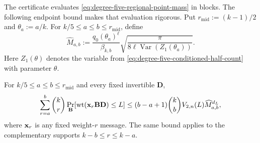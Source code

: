 The certificate evaluates \eqref{eq:degree-five-regional-point-mass} in
blocks.  The following endpoint bound makes that evaluation rigorous.  Put
$r_{\mathrm{mid}}:=(k-1)/2$ and $\theta_a:=a/k$.  For
$k/5\leq a\leq b\leq r_{\mathrm{mid}}$, define
\begin{equation}
 \widehat M_{a,b}:=
 \frac{q_0(\theta_a)^\ell}{\beta_{k,b}}
 \sqrt{\frac{\pi}{8\ell\operatorname{Var}(Z_1(\theta_a))}}.
 \label{eq:degree-five-block-point-mass}
\end{equation}
Here $Z_1(\theta)$ denotes the variable from
\eqref{eq:degree-five-conditioned-half-count} with parameter $\theta$.

\begin{lemma}
\label{lem:degree-five-central-block}
For $k/5\leq a\leq b\leq r_{\mathrm{mid}}$ and every fixed invertible
$\mathbf D$,
\begin{equation}
 \sum_{r=a}^{b}\binom{k}{r}
 \Pr_{\mathbf B}[\operatorname{wt}(\mathbf x_r\mathbf B\mathbf D)\leq L]
 \leq
 (b-a+1)\binom{k}{b}V_{2,n}(L)\widehat M_{a,b}^{d_L},
 \label{eq:degree-five-central-block}
\end{equation}
where $\mathbf x_r$ is any fixed weight-$r$ message.  The same bound applies to
the complementary supports $k-b\leq r\leq k-a$.
\end{lemma}


